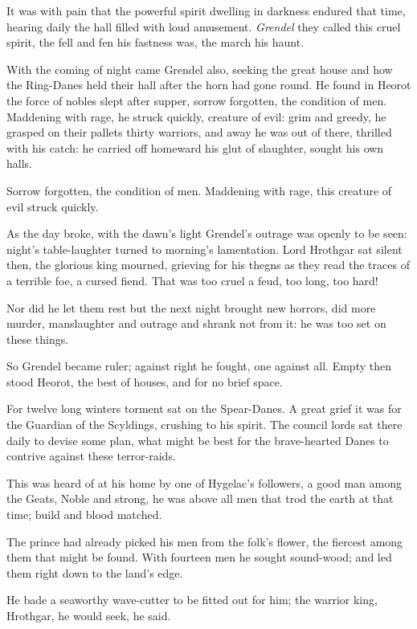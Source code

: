\documentclass[a4paper]{article}
\begin{document}
{It was with pain that the powerful spirit
dwelling in darkness endured that time,
hearing daily the hall filled with loud amusement.
\textit{Grendel} they called this cruel spirit,
the fell and fen his fastness was, the march his haunt.

With the coming of night came Grendel also,
seeking the great house and how the Ring-Danes
held their hall after the horn had gone round.
He found in Heorot the force of nobles
slept after supper, sorrow forgotten,
the condition of men. Maddening with rage,
he struck quickly, creature of evil:
grim and greedy, he grasped on their pallets
thirty warriors, and away he was out of there,
thrilled with his catch: he carried off homeward
his glut of slaughter, sought his own halls.

Sorrow forgotten, the condition of men. 
Maddening with rage, this creature of evil 
struck quickly.

As the day broke, with the dawn’s light
Grendel’s outrage was openly to be seen:
night’s table-laughter turned to morning’s
lamentation. Lord Hrothgar
sat silent then, the glorious king mourned, 
grieving for his thegns as they read the 
traces of a terrible foe,
a cursed fiend. That was too cruel a feud,
too long, too hard!

Nor did he let them rest
but the next night brought new horrors,
did more murder, manslaughter and outrage
and shrank not from it: he was too set on these things.

So Grendel became ruler; against right he fought,
one against all. Empty then stood Heorot,
the best of houses, and for no brief space.

For twelve long winters torment sat
on the Spear-Danes. A great grief it was for the
Guardian of the Scyldings, crushing to his
spirit. The council lords sat there daily to devise some plan, 
what might be best for the brave-hearted Danes 
to contrive against these terror-raids.

This was heard of at his home by one of Hygelac’s followers,
a good man among the Geats, Noble and strong,
he was above all men that trod the earth at that time; 
build and blood matched.

The prince had already picked his men
from the folk’s flower, the fiercest among them
that might be found. With fourteen men
he sought sound-wood; and led them right down 
to the land's edge.

He bade a seaworthy 
wave-cutter to be fitted out for him; the warrior king, 
Hrothgar, he would seek, he said.

}
\end{document}
